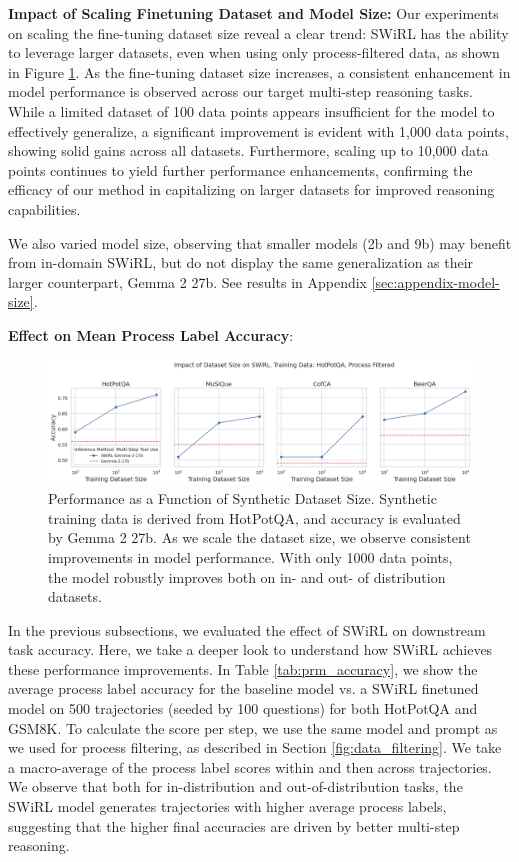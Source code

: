 \documentclass{article} %
\begin{document}
\noindent\textbf{Impact of Scaling Finetuning Dataset  and Model Size:}
Our experiments on scaling the fine-tuning dataset size reveal a clear trend: SWiRL has the ability to leverage larger datasets, even when using only process-filtered data, as shown in Figure \ref{fig:impact-of-datasize}. As the fine-tuning dataset size increases, a consistent enhancement in model performance is observed across our target multi-step reasoning tasks. While a limited dataset of 100 data points appears insufficient for the model to effectively generalize, a significant improvement is evident with 1,000 data points, showing solid gains across all datasets. Furthermore, scaling up to 10,000 data points continues to yield further performance enhancements, confirming the efficacy of our method in capitalizing on larger datasets for improved reasoning capabilities.



We also varied model size, observing that smaller models (2b and 9b) may benefit from in-domain SWiRL, but do not display the same generalization as their larger counterpart, Gemma 2 27b. See results in Appendix \ref{sec:appendix-model-size}.





\noindent\textbf{Effect on Mean Process Label Accuracy}: 
\begin{figure}[htbp]
    \centering
    \includegraphics[width=\textwidth]{datascaling.png}
    \caption{Performance as a Function of Synthetic Dataset Size. Synthetic training data is derived from HotPotQA, and accuracy is evaluated by Gemma 2 27b. As we scale the dataset size, we observe consistent improvements in model performance. With only 1000 data points, the model robustly improves both on in- and out- of distribution datasets.}
    \label{fig:impact-of-datasize}
\end{figure}
In the previous subsections, we evaluated the effect of SWiRL on downstream task accuracy. Here, we take a deeper look to understand how SWiRL achieves these performance improvements. In Table \ref{tab:prm_accuracy}, we show the average process label accuracy for the baseline model vs. a SWiRL finetuned model on 500 trajectories (seeded by 100 questions) for both HotPotQA and GSM8K. To calculate the score per step, we use the same model and prompt as we used for process filtering, as described in Section \ref{fig:data_filtering}. We take a macro-average of the process label scores within and then across trajectories. We observe that both for in-distribution and out-of-distribution tasks, the SWiRL model generates trajectories with higher average process labels, suggesting that the higher final accuracies are driven by better multi-step reasoning.
\end{document}

